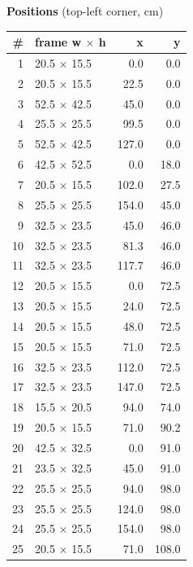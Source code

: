 \documentclass[a4paper,landscape,10pt]{article}
\begin{document}
\begin{minipage}[t]{0.25\textwidth}
\vspace{8pt}
{\bfseries Positions} (top-left corner, cm)\\[2pt]
\tiny
\begin{tabular}{@{}r l r r@{}}
\toprule
\# & frame w $\times$ h & x & y \\
\midrule
1 & 20.5 $\times$ 15.5 & 0.0 & 0.0 \\
2 & 20.5 $\times$ 15.5 & 22.5 & 0.0 \\
3 & 52.5 $\times$ 42.5 & 45.0 & 0.0 \\
4 & 25.5 $\times$ 25.5 & 99.5 & 0.0 \\
5 & 52.5 $\times$ 42.5 & 127.0 & 0.0 \\
6 & 42.5 $\times$ 52.5 & 0.0 & 18.0 \\
7 & 20.5 $\times$ 15.5 & 102.0 & 27.5 \\
8 & 25.5 $\times$ 25.5 & 154.0 & 45.0 \\
9 & 32.5 $\times$ 23.5 & 45.0 & 46.0 \\
10 & 32.5 $\times$ 23.5 & 81.3 & 46.0 \\
11 & 32.5 $\times$ 23.5 & 117.7 & 46.0 \\
12 & 20.5 $\times$ 15.5 & 0.0 & 72.5 \\
13 & 20.5 $\times$ 15.5 & 24.0 & 72.5 \\
14 & 20.5 $\times$ 15.5 & 48.0 & 72.5 \\
15 & 20.5 $\times$ 15.5 & 71.0 & 72.5 \\
16 & 32.5 $\times$ 23.5 & 112.0 & 72.5 \\
17 & 32.5 $\times$ 23.5 & 147.0 & 72.5 \\
18 & 15.5 $\times$ 20.5 & 94.0 & 74.0 \\
19 & 20.5 $\times$ 15.5 & 71.0 & 90.2 \\
20 & 42.5 $\times$ 32.5 & 0.0 & 91.0 \\
21 & 23.5 $\times$ 32.5 & 45.0 & 91.0 \\
22 & 25.5 $\times$ 25.5 & 94.0 & 98.0 \\
23 & 25.5 $\times$ 25.5 & 124.0 & 98.0 \\
24 & 25.5 $\times$ 25.5 & 154.0 & 98.0 \\
25 & 20.5 $\times$ 15.5 & 71.0 & 108.0 \\
\bottomrule
\end{tabular}
\end{minipage}
\clearpage
\end{document}
